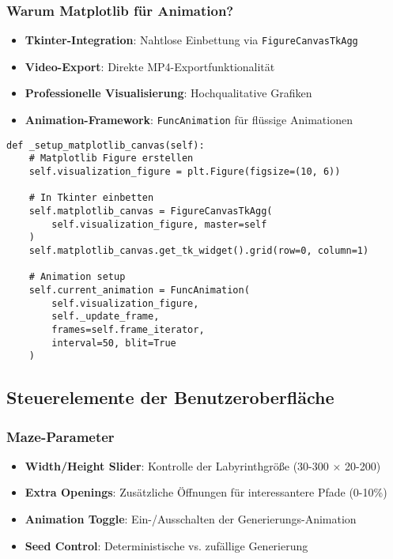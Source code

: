 \documentclass[12pt,a4paper]{article}
\begin{document}
\subsubsection{Warum Matplotlib für Animation?}

\begin{itemize}
    \item \textbf{Tkinter-Integration}: Nahtlose Einbettung via \texttt{FigureCanvasTkAgg}
    \item \textbf{Video-Export}: Direkte MP4-Exportfunktionalität
    \item \textbf{Professionelle Visualisierung}: Hochqualitative Grafiken
    \item \textbf{Animation-Framework}: \texttt{FuncAnimation} für flüssige Animationen
\end{itemize}

\begin{lstlisting}[caption={Matplotlib in Tkinter einbetten}]
def _setup_matplotlib_canvas(self):
    # Matplotlib Figure erstellen
    self.visualization_figure = plt.Figure(figsize=(10, 6))
    
    # In Tkinter einbetten
    self.matplotlib_canvas = FigureCanvasTkAgg(
        self.visualization_figure, master=self
    )
    self.matplotlib_canvas.get_tk_widget().grid(row=0, column=1)
    
    # Animation setup
    self.current_animation = FuncAnimation(
        self.visualization_figure, 
        self._update_frame,
        frames=self.frame_iterator,
        interval=50, blit=True
    )
\end{lstlisting}

\subsection{Steuerelemente der Benutzeroberfläche}

\subsubsection{Maze-Parameter}
\begin{itemize}
    \item \textbf{Width/Height Slider}: Kontrolle der Labyrinthgröße (30-300 × 20-200)
    \item \textbf{Extra Openings}: Zusätzliche Öffnungen für interessantere Pfade (0-10\%)
    \item \textbf{Animation Toggle}: Ein-/Ausschalten der Generierungs-Animation
    \item \textbf{Seed Control}: Deterministische vs. zufällige Generierung
\end{itemize}
\end{document}
